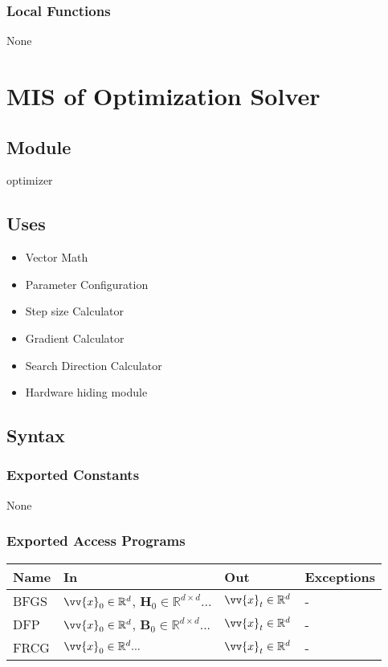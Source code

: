 \documentclass[12pt, titlepage]{article}
\begin{document}
\subsubsection{Local Functions}

None


\section{MIS of Optimization Solver}\label{Module:Optimizer}

\subsection{Module}
optimizer


\subsection{Uses}
\begin{itemize}
    \item Vector Math 
    \item Parameter Configuration
    \item Step size Calculator 
    \item Gradient Calculator 
    \item Search Direction Calculator
\end{itemize}
\begin{itemize}
    \item Hardware hiding module
\end{itemize}

\subsection{Syntax}

\subsubsection{Exported Constants}
None
\subsubsection{Exported Access Programs}

\begin{center}
\begin{tabular}{p{2cm} p{4cm} p{4cm} p{2cm}}
\hline
\textbf{Name} & \textbf{In} & \textbf{Out} & \textbf{Exceptions} \\
\hline
BFGS & $\vv{x}_{0} \in \mathbb{R}^d$, $\mathbf{H}_{0} \in \mathbb{R}^{d \times d}...$  & $\vv{x}_{t} \in \mathbb{R}^d$ & - \\
DFP & $\vv{x}_{0} \in \mathbb{R}^d$, $\mathbf{B}_{0} \in \mathbb{R}^{d \times d}...$  & $\vv{x}_{t} \in \mathbb{R}^d$ & - \\
FRCG & $\vv{x}_{0} \in \mathbb{R}^{d}...$  & $\vv{x}_{t} \in \mathbb{R}^d$ & - \\

\hline
\end{tabular}
\end{center}
\end{document}
